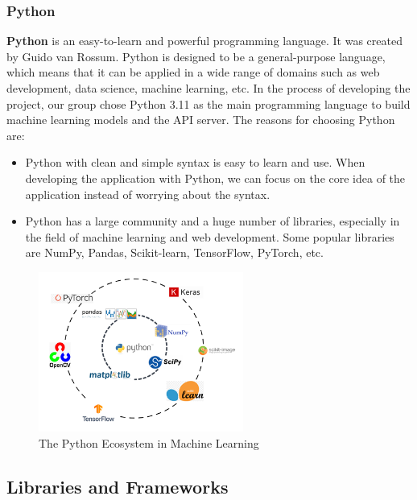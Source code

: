 \subsubsection{Python}
\textbf{Python} is an easy-to-learn and powerful programming language. It was created by Guido van Rossum. Python is designed to be a general-purpose language, which means that it can be applied in a wide range of domains such as web development, data science, machine learning, etc. In the process of developing the project, our group chose Python 3.11 as the main programming language to build machine learning models and the API server. The reasons for choosing Python are:
\begin{itemize}
    \item Python with clean and simple syntax is easy to learn and use. When developing the application with Python, we can focus on the core idea of the application instead of worrying about the syntax.
    \item Python has a large community and a huge number of libraries, especially in the field of machine learning and web development. Some popular libraries are NumPy, Pandas, Scikit-learn, TensorFlow, PyTorch, etc.
\end{itemize}

\begin{figure}[ht]
    \centering
    \includegraphics[width=0.6\textwidth]{../Images/8.Technology_Stack/python_ecosystem.png}
    \caption{The Python Ecosystem in Machine Learning}
    \label{fig:python_ecosystem}
\end{figure}



\subsection{Libraries and Frameworks}
